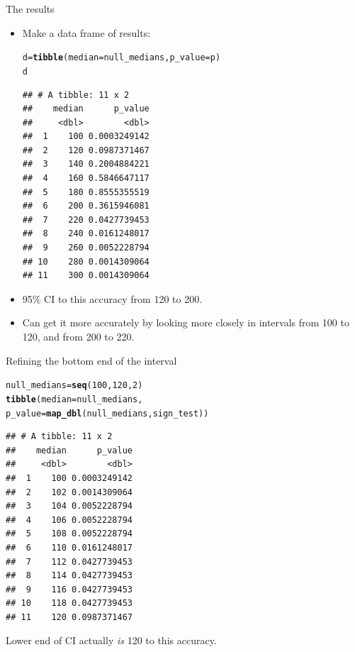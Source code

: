 \documentclass[unknownkeysallowed]{beamer}\usepackage[]{graphicx}\usepackage[]{color}
\makeatletter
\newcommand{\hlnum}[1]{\textcolor[rgb]{0.686,0.059,0.569}{#1}}%
\newcommand{\hlstd}[1]{\textcolor[rgb]{0.345,0.345,0.345}{#1}}%
\newcommand{\hlkwb}[1]{\textcolor[rgb]{0.69,0.353,0.396}{#1}}%
\newcommand{\hlkwc}[1]{\textcolor[rgb]{0.333,0.667,0.333}{#1}}%
\newcommand{\hlkwd}[1]{\textcolor[rgb]{0.737,0.353,0.396}{\textbf{#1}}}%
\newenvironment{kframe}{%
 \def\at@end@of@kframe{}%
 \ifinner\ifhmode%
  \def\at@end@of@kframe{\end{minipage}}%
  \begin{minipage}{\columnwidth}%
 \fi\fi%
 \def\FrameCommand##1{\hskip\@totalleftmargin \hskip-\fboxsep
 \colorbox{shadecolor}{##1}\hskip-\fboxsep
     \hskip-\linewidth \hskip-\@totalleftmargin \hskip\columnwidth}%
 \MakeFramed {\advance\hsize-\width
   \@totalleftmargin\z@ \linewidth\hsize
   \@setminipage}}%
 {\par\unskip\endMakeFramed%
 \at@end@of@kframe}
\newenvironment{knitrout}{}{} %
\makeatother
\begin{document}
\begin{frame}[fragile]{The results}
\begin{itemize}
\item Make a data frame of results:
\begin{knitrout}\footnotesize
{}\color{fgcolor}\begin{kframe}
\begin{alltt}
\hlstd{d}\hlkwb{=}\hlkwd{tibble}\hlstd{(}\hlkwc{median}\hlstd{=null_medians,}\hlkwc{p_value}\hlstd{=p)}
\hlstd{d}
\end{alltt}
\begin{verbatim}
## # A tibble: 11 x 2
##    median      p_value
##     <dbl>        <dbl>
##  1    100 0.0003249142
##  2    120 0.0987371467
##  3    140 0.2004884221
##  4    160 0.5846647117
##  5    180 0.8555355519
##  6    200 0.3615946081
##  7    220 0.0427739453
##  8    240 0.0161248017
##  9    260 0.0052228794
## 10    280 0.0014309064
## 11    300 0.0014309064
\end{verbatim}
\end{kframe}
\end{knitrout}
\item 95\% CI to this accuracy from 120 to 200.
\item Can get it more accurately by looking more closely in intervals
  from 100 to 120, and from 200 to 220.
\end{itemize}
\end{frame}

\begin{frame}[fragile]{Refining the bottom end of the interval}
  
\begin{knitrout}
\color{fgcolor}\begin{kframe}
\begin{alltt}
\hlstd{null_medians}\hlkwb{=}\hlkwd{seq}\hlstd{(}\hlnum{100}\hlstd{,}\hlnum{120}\hlstd{,}\hlnum{2}\hlstd{)}
\hlkwd{tibble}\hlstd{(}\hlkwc{median}\hlstd{=null_medians,}
             \hlkwc{p_value}\hlstd{=}\hlkwd{map_dbl}\hlstd{(null_medians,sign_test))}
\end{alltt}
\begin{verbatim}
## # A tibble: 11 x 2
##    median      p_value
##     <dbl>        <dbl>
##  1    100 0.0003249142
##  2    102 0.0014309064
##  3    104 0.0052228794
##  4    106 0.0052228794
##  5    108 0.0052228794
##  6    110 0.0161248017
##  7    112 0.0427739453
##  8    114 0.0427739453
##  9    116 0.0427739453
## 10    118 0.0427739453
## 11    120 0.0987371467
\end{verbatim}
\end{kframe}
\end{knitrout}

Lower end of CI actually \emph{is} 120 to this accuracy.
  
\end{frame}
\end{document}
